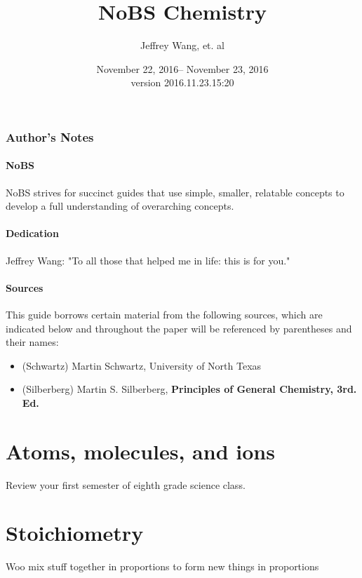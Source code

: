 \documentclass[letterpaper, 12pt]{article}
\begin{document}
\title{NoBS Chemistry}
\author{Jeffrey Wang, et. al}
\date{November 22, 2016-- November 23, 2016\\version 2016.11.23.15:20}
\maketitle


\setcounter{secnumdepth}{1}
\setcounter{section}{0}


\tableofcontents
\clearpage

\section*{Author's Notes}
	\subsection{NoBS}
	NoBS strives for succinct guides that use simple, smaller, relatable concepts to develop a full understanding of overarching concepts.
	\subsection{Dedication}
	Jeffrey Wang: "To all those that helped me in life: this is for you."
	\subsection{Sources}
	This guide borrows certain material from the following sources, which are indicated below and throughout the paper will be referenced by parentheses and their names:
	\begin{itemize}
		\item (Schwartz) Martin Schwartz, University of North Texas
		\item (Silberberg) Martin S. Silberberg,  \textbf{Principles of General Chemistry, 3rd. Ed.}
	\end{itemize}
\clearpage

	
\clearpage

\part{Atoms, molecules, and ions}
Review your first semester of eighth grade science class.

\clearpage

\part{Stoichiometry}
Woo mix stuff together in proportions to form new things in proportions
\end{document}
